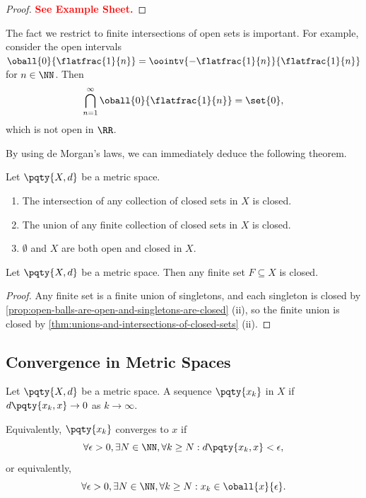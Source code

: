 \begin{proof}
    \textbf{\textcolor{red}{See Example Sheet.}}
\end{proof}

\begin{remark}
    The fact we restrict to finite intersections of open sets is important. For example, consider the open intervals \(\oball{0}{\flatfrac{1}{n}} = \oointv{-\flatfrac{1}{n}}{\flatfrac{1}{n}}\) for \(n \in \NN\). Then
    \[
        \bigcap_{n = 1}^{\infty} \oball{0}{\flatfrac{1}{n}} = \set{0},
    \]
    which is not open in \(\RR\).
\end{remark}

By using de Morgan's laws, we can immediately deduce the following theorem.

\begin{theorem}
    \label{thm:unions-and-intersections-of-closed-sets}%
    Let \(\pqty{X, d}\) be a metric space.

    \begin{enumerate}[label=(\roman*)]
        \item The intersection of any collection of closed sets in \(X\) is closed.
        \item The union of any finite collection of closed sets in \(X\) is closed.
        \item \(\emptyset\) and \(X\) are both open and closed in \(X\).
    \end{enumerate}
\end{theorem}

\begin{corollary}
    Let \(\pqty{X, d}\) be a metric space. Then any finite set \(F \subseteq X\) is closed.
\end{corollary}

\begin{proof}
    Any finite set is a finite union of singletons, and each singleton is closed by \autoref{prop:open-balls-are-open-and-singletons-are-closed} (ii), so the finite union is closed by \autoref{thm:unions-and-intersections-of-closed-sets} (ii).
\end{proof}

\subsection{Convergence in Metric Spaces}

\begin{definition}
    Let \(\pqty{X, d}\) be a metric space. A sequence \(\pqty{x_k}\) in \(X\)  if \(d\pqty{x_k, x} \to 0\) as \(k \to \infty\).

    Equivalently, \(\pqty{x_k}\) converges to \(x\) if
    \[
        \forall \epsilon > 0, \exists N \in \NN, \forall k \geq N: d\pqty{x_k, x} < \epsilon,
    \]
    or equivalently,
    \[
        \forall \epsilon > 0, \exists N \in \NN, \forall k \geq N: x_k \in \oball{x}{\epsilon}.
    \]
\end{definition}

